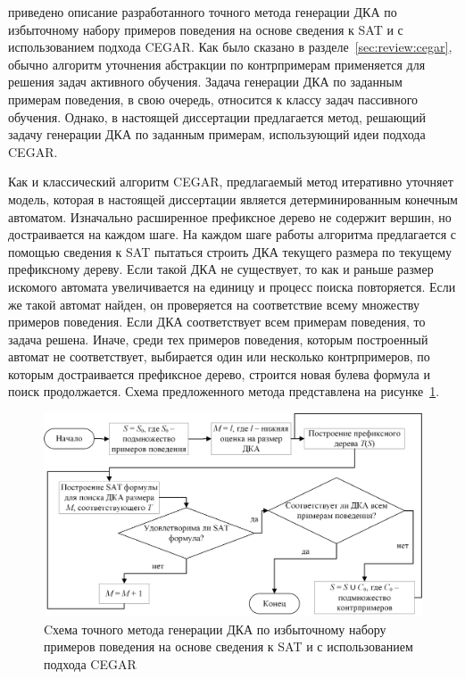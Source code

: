 \insection{\ref{sec:cegar:cegar-algo}} приведено описание разработанного точного метода генерации ДКА по избыточному набору примеров поведения на основе сведения к SAT и с использованием подхода CEGAR. 
Как было сказано в разделе~\ref{sec:review:cegar}, обычно алгоритм уточнения абстракции по контрпримерам применяется для решения задач активного обучения. 
Задача генерации ДКА по заданным примерам поведения, в свою очередь, относится к классу задач пассивного обучения.
Однако, в настоящей диссертации предлагается метод, решающий задачу генерации ДКА по заданным примерам, использующий идеи подхода CEGAR.

Как и классический алгоритм CEGAR, предлагаемый метод итеративно уточняет модель, которая в настоящей диссертации является детерминированным конечным автоматом.
Изначально расширенное префиксное дерево не содержит вершин, но достраивается на каждом шаге.
На каждом шаге работы алгоритма предлагается с помощью сведения к SAT пытаться строить ДКА текущего размера по текущему префиксному дереву.
Если такой ДКА не существует, то как и раньше размер искомого автомата увеличивается на единицу и процесс поиска повторяется.
Если же такой автомат найден, он проверяется на соответствие всему множеству примеров поведения.
Если ДКА соответствует всем примерам поведения, то задача решена.
Иначе, среди тех примеров поведения, которым построенный автомат не соответствует, выбирается один или несколько контрпримеров, по которым достраивается префиксное дерево, строится новая булева формула и поиск продолжается.
Схема предложенного метода представлена на рисунке~\ref{syn:img:cegar-algo}.

\begin{figure}[ht]
  \centering
  \includegraphics[scale=0.5]{img/ntv/cegar.jpg}
  \caption{Cхема точного метода генерации ДКА по избыточному набору примеров поведения на основе сведения к SAT и с использованием подхода CEGAR}
  \label{syn:img:cegar-algo}
\end{figure}

